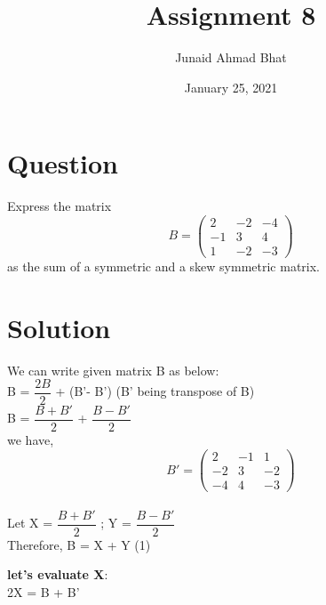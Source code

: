\documentclass[a4paper,12pt]{article}
\begin{document}
\title{Assignment 8}
\author{Junaid Ahmad Bhat}
\date{January 25, 2021}
\maketitle

\section*{\small Question}
Express the matrix \begin{equation*}
B = 
\begin{pmatrix}
2 & -2 & -4 \\
-1 & 3 & 4 \\
1 & -2 & -3
\end{pmatrix}
\end{equation*}
as the sum of a symmetric and a skew symmetric matrix.\\

\section*{\small Solution}

We can write given matrix B as below:\\

B = $\dfrac{2B}{2}$ + (B'- B')     \hspace*{3cm}  (B' being transpose of B)\\

B = $\dfrac{B+B'}{2}$ + $\dfrac{B-B'}{2}$ \\

we have,
\begin{equation*}
B'=
\begin{pmatrix}
2 & -1 & 1 \\
-2 & 3 & -2 \\
-4 & 4 & -3
\end{pmatrix}
\end{equation*}\\

Let X =  $\dfrac{B+B'}{2}$ ; Y = $\dfrac{B-B'}{2}$\\

Therefore,
B = X + Y  \hspace*{3cm}(1)\\

\pagebreak

\textbf{let's evaluate X}:\\

2X = B + B'\\
\end{document}
